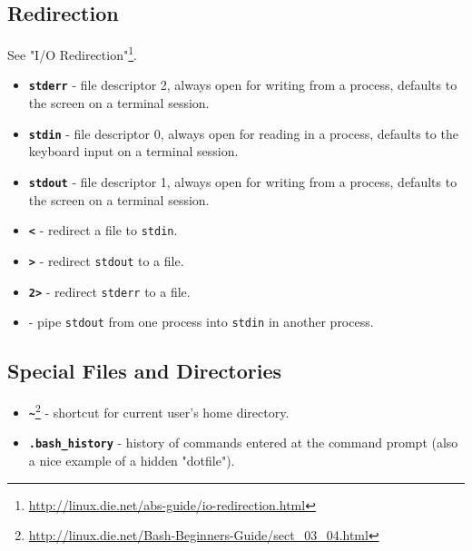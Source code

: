 \documentclass[10pt,american,]{book}
\renewcommand{\href}[2]{#2\footnote{\url{#1}}}
\numberwithin{figure}{chapter}
\begin{document}
\subsection*{Redirection}\label{redirection}

See \href{http://linux.die.net/abs-guide/io-redirection.html}{"I/O
Redirection"}.

\begin{itemize}
\item
  \textbf{\texttt{stderr}} -
  file descriptor 2, always open for writing from a process, defaults to
  the screen on a terminal session.
\item
  \textbf{\texttt{stdin}} - file
  descriptor 0, always open for reading in a process, defaults to the
  keyboard input on a terminal session.
\item
  \textbf{\texttt{stdout}} -
  file descriptor 1, always open for writing from a process, defaults to
  the screen on a terminal session.
\item
  \textbf{\texttt{\textless{}}}
   - redirect a file to
  \texttt{stdin}.
\item
  \textbf{\texttt{\textgreater{}}}
   - redirect \texttt{stdout}
  to a file.
\item
  \textbf{\texttt{2\textgreater{}}}
   - redirect \texttt{stderr}
  to a file.
\item
  \textbf{\texttt{\textbar{}}}
  - pipe \texttt{stdout} from one process into \texttt{stdin} in another
  process.
\end{itemize}

\subsection*{Special Files and
Directories}\label{special-files-and-directories}

\begin{itemize}
\item
  \href{http://linux.die.net/Bash-Beginners-Guide/sect_03_04.html}{\textbf{\texttt{\textasciitilde{}}}}
   - shortcut for
  current user's home directory.
\item
  \textbf{\texttt{.bash\_history}}
  - history of commands entered at the command prompt (also a nice
  example of a hidden "dotfile").
\end{itemize}
\end{document}
